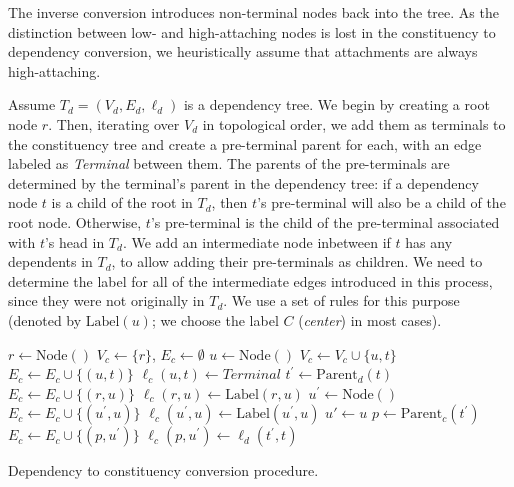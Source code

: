 \documentclass[11pt]{article}
\begin{document}
The inverse conversion introduces non-terminal nodes back into the tree. As the distinction
between low- and high-attaching nodes is lost in the constituency to dependency conversion,
we heuristically assume that attachments are always high-attaching.

Assume $T_d=(V_d,E_d,\ell_d)$ is a dependency tree. We begin by creating a root node $r$.
Then, iterating over $V_d$ in topological order,
we add them as terminals to the constituency tree and create a pre-terminal parent for each,
with an edge labeled as \textit{Terminal} between them.
The parents of the pre-terminals are determined by the terminal's parent in the dependency
tree: if a dependency node $t$ is a child of the root in $T_d$, then $t$'s pre-terminal will also be a child of the root node. Otherwise, $t$'s pre-terminal is the child of the pre-terminal associated with $t$'s head in $T_d$. We add an intermediate node inbetween if $t$ has any dependents in $T_d$, to allow adding their pre-terminals as children.
We need to determine the label for all of the intermediate edges introduced in this process, since they were not originally in $T_d$. We use a set of rules for this purpose (denoted by $\mathrm{Label}(u)$; we choose the label $C$ (\textit{center}) in most cases).

\begin{algorithm}
 $r \leftarrow \mathrm{Node()}$\;
 $V_c \leftarrow \{r\}$,
 $E_c \leftarrow \emptyset$\;
  {
  $u \leftarrow \mathrm{Node()}$\;
  $V_c \leftarrow V_c \cup \{u, t\}$\;
  $E_c \leftarrow E_c \cup \{(u, t)\}$\;
  $\ell_c(u,t)\leftarrow\mathit{Terminal}$\;
  $t^\prime \leftarrow \mathrm{Parent}_d(t)$\;
   {
   $E_c \leftarrow E_c \cup \{(r, u)\}$\;
   $\ell_c(r, u) \leftarrow \mathrm{Label}(r,u)$\;
  } {
    {
    $u^\prime \leftarrow \mathrm{Node()}$\;
    $E_c \leftarrow E_c \cup \{(u^\prime, u)\}$\;
    $\ell_c(u^\prime, u) \leftarrow \mathrm{Label}(u^\prime, u)$\;
   } {
    $u' \leftarrow u$\;
   }
   $p \leftarrow \mathrm{Parent}_c(t^\prime)$\;
   $E_c \leftarrow E_c \cup \{(p, u^\prime)\}$\;
   $\ell_c(p, u^\prime) \leftarrow \ell_d(t^\prime, t)$\;
  }
 }
 \caption{Dependency to constituency conversion procedure.}
 \label{alg:dep2con}
\end{algorithm}


\end{document}
